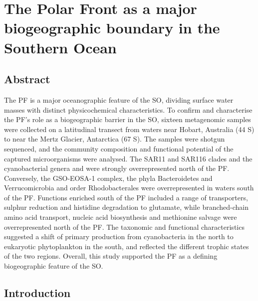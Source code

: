 \chapter[The Polar Front]{The Polar Front as a major biogeographic boundary in the Southern Ocean} 
\label{ch:polarfront}


\section{Abstract}

The \ac{PF} is a major oceanographic feature of the \ac{SO}, dividing surface water masses with distinct physicochemical characteristics.
To confirm and characterise the \ac{PF}'s role as a biogeographic barrier in the \ac{SO}, sixteen metagenomic samples were collected on a latitudinal transect from waters near Hobart, Australia (44\textdegree{} S) to near the Mertz Glacier, Antarctica (67\textdegree{} S).
The samples were shotgun sequenced, and the community composition and functional potential of the captured microorganisms were analysed.
The SAR11 and SAR116 clades and the cyanobacterial genera  and  were strongly overrepresented north of the \ac{PF}.
Conversely, the \ac{GSO-EOSA-1} complex, the phyla Bacteroidetes and Verrucomicrobia and order Rhodobacterales were overrepresented in waters south of the \ac{PF}. 
Functions enriched south of the \ac{PF} included a range of transporters, sulphur reduction and histidine degradation to glutamate, while branched-chain amino acid transport, nucleic acid biosynthesis and methionine salvage were overrepresented north of the \ac{PF}.
The taxonomic and functional characteristics suggested a shift of primary production from cyanobacteria in the north to eukaryotic phytoplankton in the south, and reflected the different trophic states of the two regions. 
Overall, this study supported the \ac{PF} as a defining biogeographic feature of the \ac{SO}.

\glsresetall

\section{Introduction}

